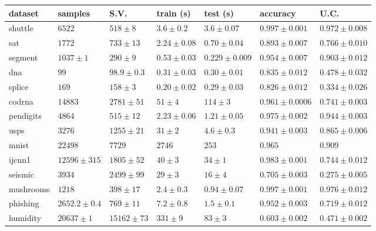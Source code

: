 \begin{tabular}{|l|llllll|}
\hline
dataset & samples & S.V. & train (s) & test (s) & accuracy & U.C. \\
\hline
shuttle  & $    6522$ & $         518\pm      8$ & $        3.6\pm      0.2$ & $        3.6\pm    0.07$ & $       0.997\pm  0.001$ & $       0.972\pm   0.008$\\
sat  & $    1772$ & $         733\pm       13$ & $        2.24\pm    0.08$ & $       0.70\pm    0.04$ & $       0.893\pm   0.007$ & $       0.766\pm     0.010$\\
segment  & $    1037\pm     1$ & $         290\pm        9$ & $       0.53\pm    0.03$ & $       0.229\pm   0.009$ & $       0.954\pm   0.007$ & $       0.903\pm    0.012$\\
dna  & $          99$ & $        98.9\pm     0.3$ & $       0.31\pm    0.03$ & $       0.30\pm    0.01$ & $       0.835\pm    0.012$ & $       0.478\pm    0.032$\\
splice  & $         169$ & $         158\pm      3$ & $         0.20\pm    0.02$ & $       0.29\pm     0.03$ & $       0.826\pm    0.012$ & $       0.334\pm    0.026$\\
codrna  & $    14883$ & $    2781\pm       51$ & $        51\pm      4$ & $         114\pm      3$ & $       0.961\pm  0.0006$ & $       0.741\pm   0.003$\\
pendigits  & $    4864$ & $         515\pm       12$ & $        2.23\pm    0.06$ & $        1.21\pm    0.05$ & $       0.975\pm   0.002$ & $       0.944\pm   0.003$\\
usps  & $    3276$ & $    1255\pm       21$ & $        31\pm      2$ & $        4.6\pm     0.3$ & $       0.941\pm   0.003$ & $       0.865\pm   0.006$\\
mnist & $ 22498$ & $7729$ & $2746$ & $253$ & $0.965$ & $0.909$ \\
ijcnn1  & $    12596\pm  315$ & $    1805\pm       52$ & $          40\pm      3$ & $          34\pm      1$ & $       0.983\pm   0.001$ & $       0.744\pm    0.012$\\
seismic  & $    3934$ & $     2499\pm       99$ & $        29\pm      3$ & $        16\pm      4$ & $       0.705\pm   0.003$ & $       0.275\pm   0.005$\\
mushrooms  & $    1218$ & $         398\pm       17$ & $         2.4\pm     0.3$ & $       0.94\pm    0.07$ & $       0.997\pm   0.001$ & $       0.976\pm    0.012$\\
phishing  & $    2652.2\pm     0.4$ & $         769\pm       11$ & $        7.2\pm     0.8$ & $        1.5\pm     0.1$ & $       0.952\pm   0.003$ & $       0.719\pm    0.012$\\
humidity  & $    20637\pm     1$ & $    15162\pm       73$ & $         331\pm        9$ & $        83\pm      3$ & $       0.603\pm   0.002$ & $       0.471\pm    0.002$\\
\hline
\end{tabular}

